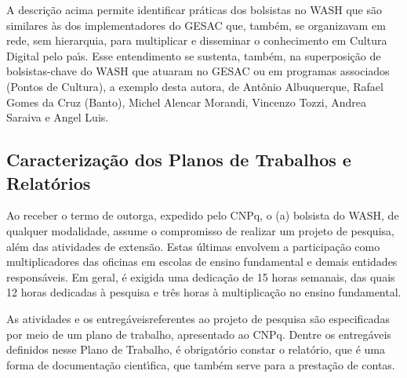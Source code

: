 \documentclass[
12pt,		%
openright,	%
twoside,  %
a4paper,			%
chapter=TITLE,		%
english,			%
french,				%
spanish,			%
brazil				%
]{USPSC-classe/USPSC}
\begin{document}
A descri\c{c}\~ao acima permite identificar pr\'aticas dos bolsistas no WASH que s\~ao similares \`as dos implementadores do GESAC que, tamb\'em, se organizavam em rede, sem hierarquia, para multiplicar e disseminar o conhecimento em Cultura Digital pelo pa\'{\i}s. Esse entendimento se sustenta, tamb\'em, na superposi\c{c}\~ao de bolsistas-chave do WASH que atuaram no GESAC ou em programas associados (Pontos de Cultura), a exemplo desta autora, de Ant\^onio Albuquerque, Rafael Gomes da Cruz (Banto), Michel Alencar Morandi, Vincenzo Tozzi, Andrea Saraiva e Angel Luis.

















\subsection[Caracteriza\c{c}\~ao dos Planos de Trabalhos e Relat\'orios]{Caracteriza\c{c}\~ao dos Planos de Trabalhos e Relat\'orios}\label{Caracteriza\c{c}\~ao dos Planos de Trabalhos e Relat\'orios}
Ao receber o termo de outorga, expedido pelo CNPq, o (a) bolsista do WASH, de qualquer modalidade, assume o compromisso de realizar um projeto de pesquisa, al\'em das atividades de extens\~ao. Estas \'ultimas envolvem a participa\c{c}\~ao como multiplicadores das oficinas em escolas de ensino fundamental e demais entidades respons\'aveis. Em geral, \'e exigida uma dedica\c{c}\~ao de 15 horas semanais, das quais 12 horas dedicadas \`a pesquisa e tr\^es horas \`a multiplica\c{c}\~ao no ensino fundamental.

















As atividades e os \textquotedbl entreg\'aveis\textquotedbl  referentes ao projeto de pesquisa s\~ao especificadas por meio de um plano de trabalho, apresentado ao CNPq. Dentre os entreg\'aveis definidos nesse Plano de Trabalho, \'e obrigat\'orio constar o relat\'orio, que \'e uma forma de documenta\c{c}\~ao cient\'{\i}fica, que tamb\'em serve para a presta\c{c}\~ao de contas.
\end{document}
